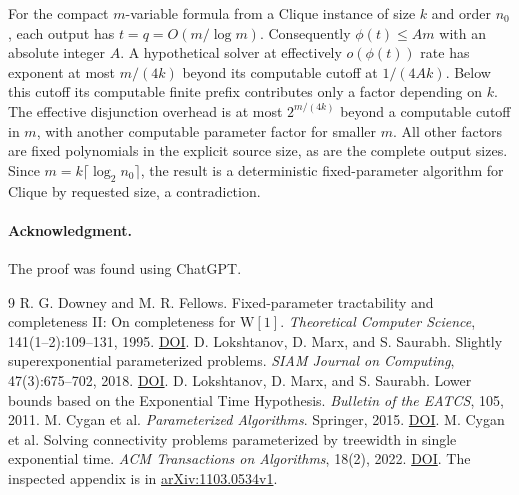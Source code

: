 \documentclass[11pt]{article}
\begin{document}
For the compact \(m\)-variable formula from a Clique instance
of size \(k\) and order \(n_0\), each output has \(t=q=O(m/\log m)\).
Consequently \(\phi(t)\le Am\) with an absolute integer \(A\).
A hypothetical solver at effectively \(o(\phi(t))\) rate has
exponent at most \(m/(4k)\) beyond its computable cutoff at
\(1/(4Ak)\). Below this cutoff its computable finite prefix
contributes only a factor depending on \(k\).
The effective disjunction overhead is at most \(2^{m/(4k)}\)
beyond a computable cutoff in \(m\), with another computable
parameter factor for smaller \(m\). All other factors are
fixed polynomials in the explicit source size, as are the
complete output sizes. Since \(m=k\lceil\log_2 n_0\rceil\), the
result is a deterministic fixed-parameter algorithm for
Clique by requested size, a contradiction.

\paragraph{Acknowledgment.}
The proof was found using ChatGPT.

\begin{thebibliography}{9}
R. G. Downey and M. R. Fellows. Fixed-parameter tractability and
completeness II: On completeness for \(\mathrm W[1]\).
\emph{Theoretical Computer Science}, 141(1--2):109--131, 1995.
\href{https://doi.org/10.1016/0304-3975(94)00097-3}{DOI}.
D. Lokshtanov, D. Marx, and S. Saurabh.
Slightly superexponential parameterized problems.
\emph{SIAM Journal on Computing}, 47(3):675--702, 2018.
\href{https://doi.org/10.1137/16M1104834}{DOI}.
D. Lokshtanov, D. Marx, and S. Saurabh.
Lower bounds based on the Exponential Time Hypothesis.
\emph{Bulletin of the EATCS}, 105, 2011.
M. Cygan et al. \emph{Parameterized Algorithms}. Springer, 2015.
\href{https://doi.org/10.1007/978-3-319-21275-3}{DOI}.
M. Cygan et al.
Solving connectivity problems parameterized by treewidth in single
exponential time. \emph{ACM Transactions on Algorithms}, 18(2), 2022.
\href{https://doi.org/10.1145/3506707}{DOI}.
The inspected appendix is in
\href{https://arxiv.org/abs/1103.0534v1}{arXiv:1103.0534v1}.
\end{thebibliography}
\end{document}
